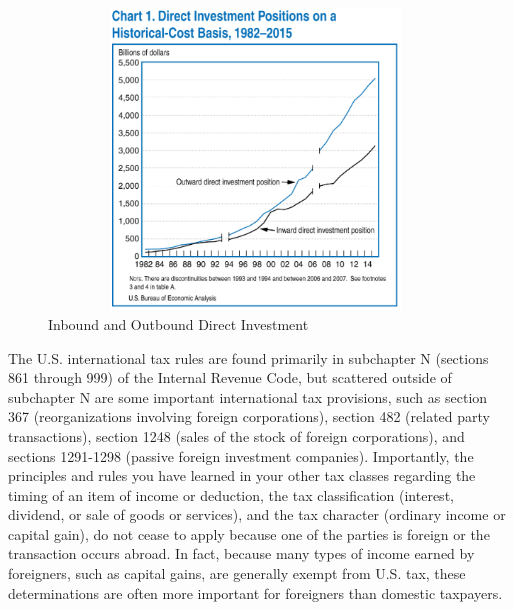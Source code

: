  \begin{figure}[hbtp]
 \caption{Inbound and Outbound Direct Investment}
 \begin{center}
\includegraphics[width=110mm, height=80mm,clip, trim= 3mm 4mm 4mm 20mm]{DirectInvest_2015.png}
 \end{center}
 \label{your-reference-key}
 \end{figure} 

The U.S. international tax rules are found primarily in subchapter N (sections 861 through 999) of the Internal Revenue Code, but scattered outside of subchapter N are some important international tax provisions, such as section 367 (reorganizations involving foreign corporations), section 482 (related party transactions), section 1248 (sales of the stock of foreign corporations), and sections 1291-1298 (passive foreign investment companies).  Importantly, the principles and rules you have learned in your other tax classes regarding the timing of an item of income or deduction, the tax classification (interest, dividend, or sale of goods or services), and the tax character (ordinary income or capital gain), do not cease to apply because one of the parties is foreign or the transaction occurs abroad.  In fact, because many types of income earned by foreigners, such as capital gains, are generally exempt from U.S. tax, these determinations are often more important for foreigners than domestic taxpayers.


